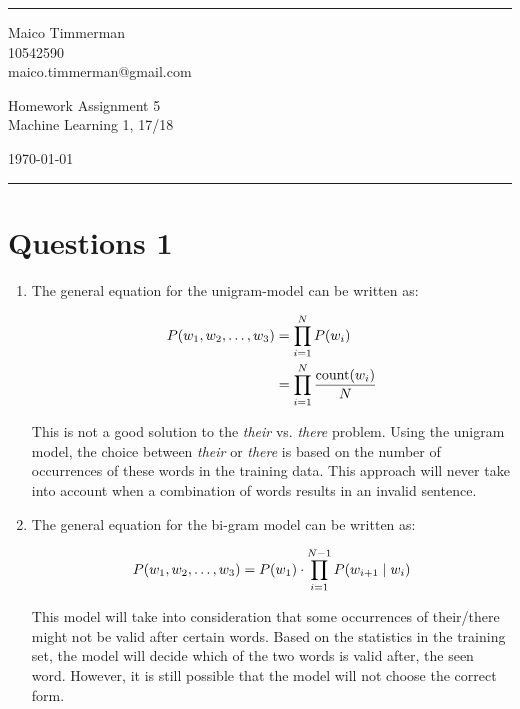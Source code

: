 \documentclass[a4paper]{article}
\begin{document}

\fancyhead[C]{}
\hrule \medskip %
\begin{minipage}{0.295\textwidth}
    \raggedright
    \footnotesize
    Maico Timmerman \hfill\\
    10542590\hfill\\
    maico.timmerman@gmail.com
\end{minipage}
\begin{minipage}{0.4\textwidth}
    \centering
    \large
    Homework Assignment 5\\
    \normalsize
    Machine Learning 1, 17/18\\
\end{minipage}
\begin{minipage}{0.295\textwidth}
    \raggedleft
    \today\hfill\\
\end{minipage}
\medskip\hrule
\bigskip


\section*{Questions 1}
\begin{enumerate}[label=(\alph*)]
    \item The general equation for the unigram-model can be written as:

        \begin{align}
            P(w_1, w_2, \ldots, w_3) &= \prod\limits_{i=1}^{N} P(w_i)\\
            &= \prod\limits_{i=1}^{N} \frac{\text{count}(w_i)}{N}\\
        \end{align}

        This is not a good solution to the \textit{their} vs. \textit{there}
        problem. Using the unigram model, the choice between \textit{their} or
        \textit{there} is based on the number of occurrences of these words in
        the training data. This approach will never take into account when a
        combination of words results in an invalid sentence.

    \item The general equation for the bi-gram model can be written as:

        \begin{align}
            P(w_1, w_2, \ldots, w_3) &= P(w_1)\cdot\prod\limits_{i=1}^{N-1} P(w_{i+1}
            \mid w_i)\\
        \end{align}

        This model will take into consideration that some occurrences of
        their/there might not be valid after certain words. Based on the
        statistics in the training set, the model will decide which of the two
        words is valid after, the seen word. However, it is still possible that
        the model will not choose the correct form.

\end{enumerate}
\end{document}
